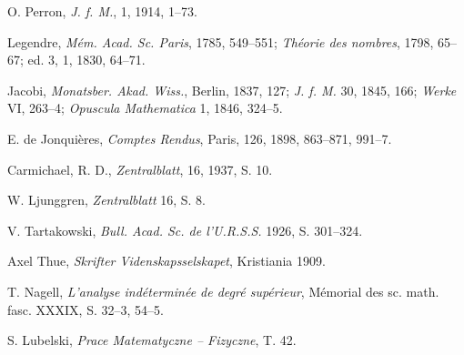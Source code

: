 \foreignlanguage{english}{O. Perron, \textit{J. f. M.}, 1, 1914, 1--73.}

\foreignlanguage{english}{Legendre, \textit{M\'em. Acad. Sc. Paris}, 1785, 549--551; \textit{Th\'eorie des nombres}, 1798, 65--67; ed. 3, 1, 1830, 64--71.}

\foreignlanguage{english}{Jacobi, \textit{Monatsber. Akad. Wiss.}, Berlin, 1837, 127; \textit{J. f. M.} 30, 1845, 166; \textit{Werke} VI, 263--4; \textit{Opuscula Mathematica} 1, 1846, 324--5.}

\foreignlanguage{english}{E. de Jonqui\`eres, \textit{Comptes Rendus}, Paris, 126, 1898, 863--871, 991--7.}

\foreignlanguage{english}{Carmichael, R. D., \textit{Zentralblatt}, 16, 1937, S. 10.}

\foreignlanguage{english}{W. Ljunggren, \textit{Zentralblatt} 16, S. 8.}

\foreignlanguage{english}{V. Tartakowski, \textit{Bull. Acad. Sc. de l'U.R.S.S.} 1926, S. 301--324.}

\foreignlanguage{english}{Axel Thue, \textit{Skrifter Videnskapsselskapet}, Kristiania 1909.}

\foreignlanguage{english}{T. Nagell, \textit{L'analyse ind\'etermin\'ee de degr\'e sup\'erieur}, M\'emorial des sc. math. fasc. XXXIX, S. 32--3, 54--5.}

\foreignlanguage{english}{S. Lubelski, \textit{Prace Matematyczne -- Fizyczne}, T. 42.}

